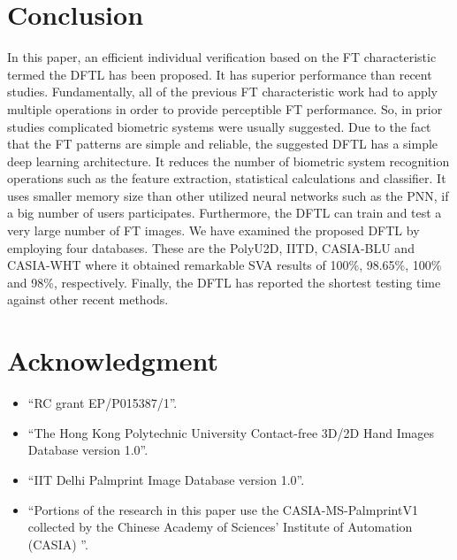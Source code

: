 \documentclass[conference]{IEEEtran}
\begin{document}


\section{Conclusion}
In this paper, an efficient individual verification based on the FT characteristic termed the DFTL has been proposed. It has superior performance than recent studies. Fundamentally, all of the previous FT characteristic work had to apply multiple operations in order to provide perceptible FT performance. So, in prior studies complicated biometric systems were usually suggested. Due to the fact that the FT patterns are simple and reliable, the suggested DFTL has a simple deep learning architecture. It reduces the number of biometric system recognition operations such as the feature extraction, statistical calculations and classifier. It uses smaller memory size than other utilized neural networks such as the PNN, if a big number of users participates. Furthermore, the DFTL can train and test a very large number of FT images. We have examined the proposed DFTL by employing four databases. These are the PolyU2D, IITD, CASIA-BLU and CASIA-WHT where it obtained remarkable SVA results of 100\%, 98.65\%, 100\% and 98\%, respectively. Finally, the DFTL has reported the shortest testing time against other recent methods.

\section*{Acknowledgment}
\begin{itemize}
  \item \enquote{RC grant EP/P015387/1}.
  \item \enquote{The Hong Kong Polytechnic University  Contact-free 3D/2D Hand Images Database version 1.0}. 
  \item \enquote{IIT Delhi Palmprint Image Database version 1.0}.
  \item \enquote{Portions of the research in this paper use the CASIA-MS-PalmprintV1 collected by the Chinese Academy of Sciences' Institute of Automation (CASIA) }.
  \end{itemize}



\end{document}
